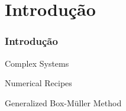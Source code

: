 
\section{Introdução}

\begin{frame}
  \frametitle{Introdução}

  Complex Systems \cite{Sayama:2015:ComplexSystems}
  \hfill \break

  Numerical Recipes \cite{Press:Numerical:Recipes}
  \hfill \break

  Generalized Box-Müller Method \cite{Tsallis:2007:GeneralizedBoxMuller}
\end{frame}

